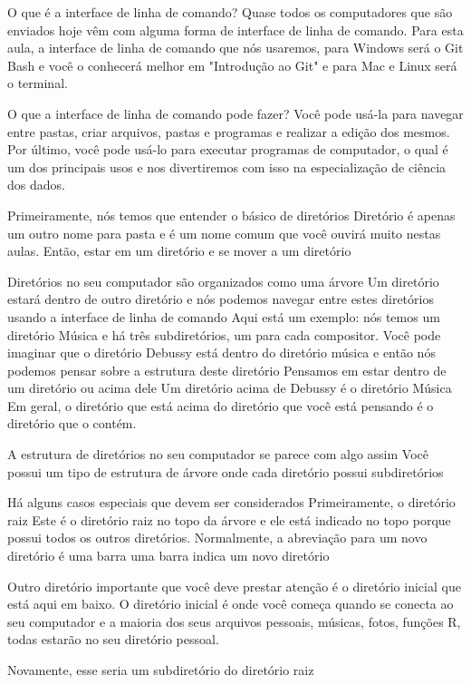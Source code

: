 O que é a interface de linha de comando? Quase todos os computadores que são enviados hoje vêm com alguma forma de interface de linha de comando. Para esta aula, a interface de linha de comando que nós usaremos, para Windows será o Git Bash e você o conhecerá melhor em "Introdução ao Git" e para Mac e Linux será o terminal. 

O que a interface de linha de comando pode fazer? Você pode usá-la para navegar entre pastas, criar arquivos, pastas e programas  e realizar a edição dos mesmos. Por último, você pode usá-lo para executar programas de computador, o qual é um dos principais usos e nos divertiremos com isso na especialização de ciência dos dados. 

Primeiramente, nós temos que entender o básico de diretórios Diretório é apenas um outro nome para pasta e é um nome comum que você ouvirá muito nestas aulas. Então, estar em um diretório e se mover a um diretório 

Diretórios no seu computador são organizados como uma árvore Um diretório estará dentro de outro diretório e nós podemos navegar entre estes diretórios usando a interface de linha de comando Aqui está um exemplo: nós temos um diretório Música  e há três subdiretórios, um para cada compositor. Você pode imaginar que o diretório Debussy está dentro do diretório música e então nós podemos pensar sobre a estrutura deste diretório Pensamos em estar dentro de um diretório ou acima dele Um diretório acima de Debussy é o diretório Música Em geral, o diretório que está acima do diretório que você está pensando é o diretório que o contém. 

A estrutura de diretórios no seu computador se parece com algo assim Você possui um tipo de estrutura de árvore onde cada diretório possui subdiretórios 

Há alguns casos especiais que devem ser considerados Primeiramente, o diretório raiz Este é o diretório raiz no topo da árvore e ele está indicado no topo porque possui todos os outros diretórios. Normalmente, a abreviação para um novo diretório é uma barra uma barra indica um novo diretório 

Outro diretório importante que você deve prestar atenção é o diretório inicial que está aqui em baixo. O diretório inicial é onde você começa quando se conecta ao seu computador e a maioria dos seus arquivos pessoais, músicas, fotos, funções R, todas estarão no seu diretório pessoal. 

Novamente, esse seria um subdiretório do diretório raiz 

